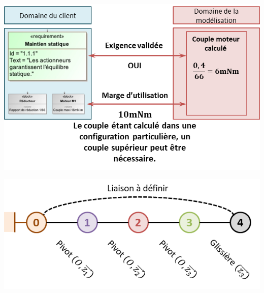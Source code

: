 \documentclass[10pt,fleqn]{article} %
\begin{document}
\ifprof
\begin{center}
\includegraphics[width=.8\linewidth]{images/cor_02}
\end{center}

\else
\begin{center}
\includegraphics[width=\linewidth]{images/fig_10}
\end{center}
\fi

\end{document}

